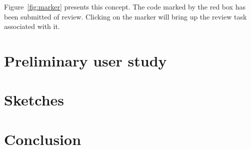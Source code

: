 \documentclass{sigchi}
\begin{document}
Figure~\ref{fig:marker} presents this concept. The code marked by the red box has been submitted of
review. Clicking on the marker will bring up the review task associated with it.

\section{Preliminary user study}
\section{Sketches}
\section{Conclusion}



\end{document}
